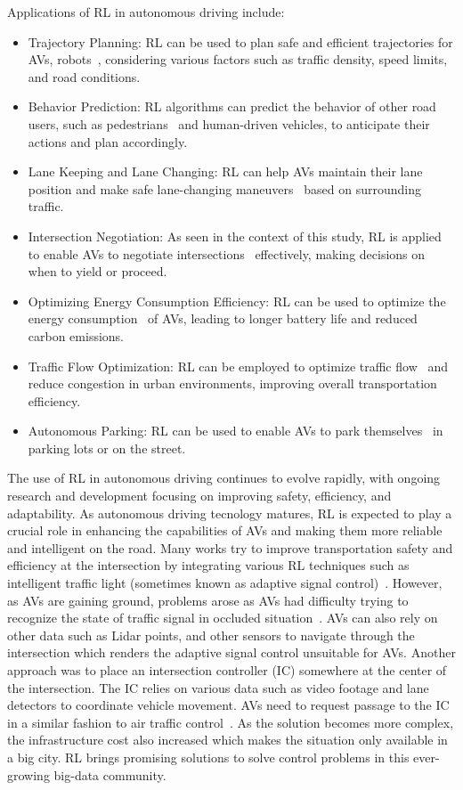 Applications of RL in autonomous driving include:
\begin{itemize}
    \item Trajectory Planning: RL can be used to plan safe and efficient trajectories for AVs, robots~\cite{9940484, 10.3389/fnbot.2022.883562}, considering various factors such as traffic density, speed limits, and road conditions.
    \item Behavior Prediction: RL algorithms can predict the behavior of other road users, such as pedestrians~\cite{Fintz2022} and human-driven vehicles, to anticipate their actions and plan accordingly.
    \item Lane Keeping and Lane Changing: RL can help AVs maintain their lane position and make safe lane-changing maneuvers~\cite{Zhou2022} based on surrounding traffic.
    \item Intersection Negotiation: As seen in the context of this study, RL is applied to enable AVs to negotiate intersections~\cite{qian2017autonomous, peng2021learning, wu2020cooperative} effectively, making decisions on when to yield or proceed.
    \item Optimizing Energy Consumption Efficiency: RL can be used to optimize the energy consumption~\cite{HE2021176, s20082361} of AVs, leading to longer battery life and reduced carbon emissions.
    \item Traffic Flow Optimization: RL can be employed to optimize traffic flow~\cite{WALRAVEN2016203} and reduce congestion in urban environments, improving overall transportation efficiency.
    \item Autonomous Parking: RL can be used to enable AVs to park themselves~\cite{s22176655} in parking lots or on the street.
\end{itemize}
The use of RL in autonomous driving continues to evolve rapidly, with ongoing research and development focusing on improving safety, efficiency, and adaptability.
As autonomous driving tecnology matures, RL is expected to play a crucial role in enhancing the capabilities of AVs and making them more reliable and intelligent on the road.
Many works try to improve transportation safety and
efficiency at the intersection by integrating various RL
techniques such as intelligent traffic light (sometimes known
as adaptive signal control)~\cite{yang2022inductive, wang2021adaptive, essa2020selflearning}.
However, as AVs are gaining ground, problems
arose as AVs had difficulty trying to recognize the state of
traffic signal in occluded situation~\cite{Isele2017}.
AVs can also rely on
other data such as Lidar points, and other sensors to navigate
through the intersection which renders the adaptive signal
control unsuitable for AVs.
Another approach was to place an
intersection controller (IC) somewhere at the center of the
intersection.
The IC relies on various data such as video
footage and lane detectors to coordinate vehicle movement.
AVs need to request passage to the IC in a similar fashion to
air traffic control~\cite{li2021planning, gunarathna2022intelligent, qian2017autonomous, chen2019intersection}.
As the solution becomes more
complex, the infrastructure cost also increased which makes
the situation only available in a big city.
RL brings promising
solutions to solve control problems in this ever-growing big-data community.

